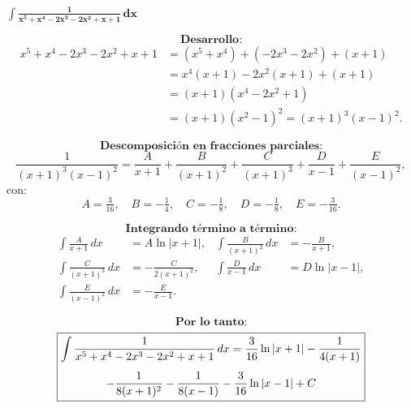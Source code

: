 $\displaystyle \mathbf{\int \frac{1}{x^{5}+x^{4}-2x^{3}-2x^{2}+x+1}\,dx}$

\nopagebreak
\[
\textbf{Desarrollo:}
\]
\[
\begin{aligned}
x^{5}+x^{4}-2x^{3}-2x^{2}+x+1
&= (x^{5}+x^{4}) + (-2x^{3}-2x^{2}) + (x+1) \\[2pt]
&= x^{4}(x+1) - 2x^{2}(x+1) + (x+1) \\[2pt]
&= (x+1)(x^{4}-2x^{2}+1) \\[2pt]
&= (x+1)(x^{2}-1)^{2} = (x+1)^{3}(x-1)^{2}.
\end{aligned}
\]

\nopagebreak
\[
\textbf{Descomposición en fracciones parciales:}
\]
\[
\frac{1}{(x+1)^{3}(x-1)^{2}}
= \frac{A}{x+1} + \frac{B}{(x+1)^{2}} + \frac{C}{(x+1)^{3}}
+ \frac{D}{x-1} + \frac{E}{(x-1)^{2}},
\]
con:
\[
A=\tfrac{3}{16}, \quad B=-\tfrac{1}{4}, \quad C=-\tfrac{1}{8}, \quad
D=-\tfrac{1}{8}, \quad E=-\tfrac{3}{16}.
\]

\nopagebreak
\[
\textbf{Integrando término a término:}
\]
\[
\begin{aligned}
\int \frac{A}{x+1}\,dx &= A\ln|x+1|, &
\int \frac{B}{(x+1)^{2}}\,dx &= -\frac{B}{x+1}, \\[4pt]
\int \frac{C}{(x+1)^{3}}\,dx &= -\frac{C}{2(x+1)^{2}}, &
\int \frac{D}{x-1}\,dx &= D\ln|x-1|, \\[4pt]
\int \frac{E}{(x-1)^{2}}\,dx &= -\frac{E}{x-1}.
\end{aligned}
\]

\nopagebreak
\[
\textbf{Por lo tanto:}
\]
\[
\boxed{%
\begin{gathered}
\displaystyle
\int \frac{1}{x^{5}+x^{4}-2x^{3}-2x^{2}+x+1}\,dx
= \frac{3}{16}\ln|x+1|
- \frac{1}{4(x+1)} \\[4pt]
\displaystyle
- \frac{1}{8(x+1)^{2}}
- \frac{1}{8(x-1)}
- \frac{3}{16}\ln|x-1|
+ C
\end{gathered}
}
\]
